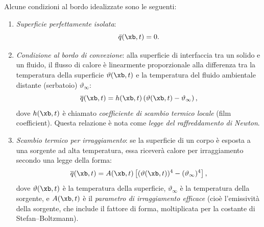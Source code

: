 Alcune condizioni al bordo idealizzate sono le seguenti:
\begin{enumerate}
	\item \textit{Superficie perfettamente isolata}:
	\begin{equation}
		\bar{q}(\xb, t)=0.
	\end{equation}
	\item \textit{Condizione al bordo di convezione}: alla superficie di interfaccia tra un solido e un fluido, il flusso di calore è linearmente proporzionale alla differenza tra la temperatura della superficie \( \vartheta(\xb,t) \) e la temperatura del fluido ambientale distante (serbatoio) \( \vartheta_\infty \):
	\[
	\overline{q}(\xb,t) = h(\xb,t) \left( \vartheta(\xb,t) - \vartheta_\infty \right), 
	\]
	dove \( h(\xb,t) \) è chiamato \textit{coefficiente di scambio termico locale} (film coefficient). Questa relazione è nota come \emph{legge del raffreddamento di Newton}.
\item \textit{Scambio termico per irraggiamento}: se la superficie di un corpo è esposta a una sorgente ad alta temperatura, essa riceverà calore per irraggiamento secondo una legge della forma:  
\[
\overline{q}(\xb,t) = A(\xb,t) \left[ (\vartheta(\xb,t))^4 - (\vartheta_\infty)^4 \right], 
\]  
dove \( \vartheta(\xb,t) \) è la temperatura della superficie, \( \vartheta_\infty \) è la temperatura della sorgente, e \( A(\xb,t) \) è il \textit{parametro di irraggiamento efficace} (cioè l'emissività della sorgente, che include il fattore di forma, moltiplicata per la costante di Stefan–Boltzmann).  


	

\end{enumerate}


%
%
%


